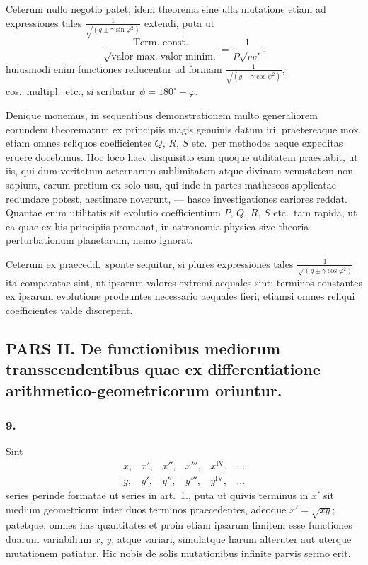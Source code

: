 \documentclass[12pt,a4paper]{article}
\begin{document}
Ceterum nullo negotio patet, idem theorema sine ulla mutatione etiam ad expressiones tales $\frac{1}{\sqrt{(g \pm \gamma\sin\varphi^2)}}$ extendi, puta ut
\[
\frac{\text{Term.\ const.}}{\sqrt{\text{valor max.}\cdot\text{valor minim.}}} = \frac{1}{P\sqrt{vv'}}.
\]
huiusmodi enim functiones reducentur ad formam $\frac{1}{\sqrt{(g - \gamma\cos\psi^2)}}$, cos.\ multipl.\ etc., si scribatur $\psi = 180^{\circ} - \varphi$.

Denique monemus, in sequentibus demonstrationem multo generaliorem eorundem theorematum ex principiis magis genuinis datum iri; praetereaque mox etiam omnes reliquos coefficientes $Q$, $R$, $S$ etc.\ per methodos aeque expeditas eruere docebimus. Hoc loco haec disquisitio eam quoque utilitatem praestabit, ut iis, qui dum veritatum aeternarum sublimitatem atque divinam venustatem non sapiunt, earum pretium ex solo usu, qui inde in partes matheseos applicatae redundare potest, aestimare noverunt, --- hasce investigationes cariores reddat. Quantae enim utilitatis sit evolutio coefficientium $P$, $Q$, $R$, $S$ etc.\ tam rapida, ut ea quae ex his principiis promanat, in astronomia physica sive theoria perturbationum planetarum, nemo ignorat.

Ceterum ex praecedd.\ sponte sequitur, si plures expressiones tales $\frac{1}{\sqrt{(g \pm \gamma\cos\varphi^2)}}$ ita comparatae sint, ut ipsarum valores extremi aequales sint: terminos constantes ex ipsarum evolutione prodeuntes necessario aequales fieri, etiamsi omnes reliqui coefficientes valde discrepent.

\subsection*{PARS II. De functionibus mediorum transscendentibus quae ex differentiatione arithmetico-geometricorum oriuntur.}

\setcounter{subsubsection}{0}
\subsubsection*{9.}

Sint
\[
\begin{array}{cccccc}
x, & x', & x'', & x''', & x^{\mathrm{IV}}, & \dots \\
y, & y', & y'', & y''', & y^{\mathrm{IV}}, & \dots
\end{array}
\tag{I, II}
\]
series perinde formatae ut series in art.\ 1., puta ut quivis terminus in $x'$ sit medium geometricum inter duos terminos praecedentes, adeoque $x' = \sqrt{xy}$; patetque, omnes has quantitates et proin etiam ipsarum limitem esse functiones duarum variabilium $x$, $y$, atque variari, simulatque harum alteruter aut uterque mutationem patiatur. Hic nobis de solis mutationibus infinite parvis sermo erit.
\end{document}
